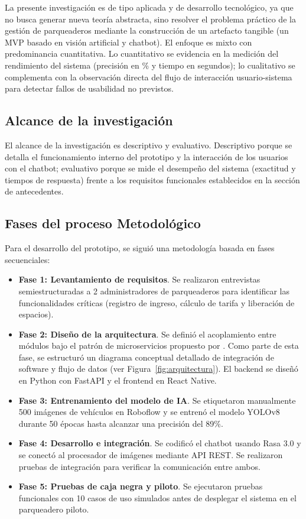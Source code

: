 La presente investigación es de tipo aplicada y de desarrollo tecnológico, ya que no busca generar nueva teoría abstracta, sino resolver el problema práctico de la gestión de parqueaderos mediante la construcción de un artefacto tangible (un MVP basado en visión artificial y chatbot). El enfoque es mixto con predominancia cuantitativa. Lo cuantitativo se evidencia en la medición del rendimiento del sistema (precisión en \% y tiempo en segundos); lo cualitativo se complementa con la observación directa del flujo de interacción usuario-sistema para detectar fallos de usabilidad no previstos.

\subsection{Alcance de la investigación}

El alcance de la investigación es descriptivo y evaluativo. Descriptivo porque se detalla el funcionamiento interno del prototipo y la interacción de los usuarios con el chatbot; evaluativo porque se mide el desempeño del sistema (exactitud y tiempos de respuesta) frente a los requisitos funcionales establecidos en la sección de antecedentes.

\subsection{Fases del proceso Metodológico}

Para el desarrollo del prototipo, se siguió una metodología basada en fases secuenciales:

\begin{itemize}
    \item \textbf{Fase 1: Levantamiento de requisitos}. Se realizaron entrevistas semiestructuradas a 2 administradores de parqueaderos para identificar las funcionalidades críticas (registro de ingreso, cálculo de tarifa y liberación de espacios).
    \item \textbf{Fase 2: Diseño de la arquitectura}. Se definió el acoplamiento entre módulos bajo el patrón de microservicios propuesto por \textcite{Garcia2023}. Como parte de esta fase, se estructuró un diagrama conceptual detallado de integración de software y flujo de datos (ver Figura~\ref{fig:arquitectura}). El backend se diseñó en Python con FastAPI y el frontend en React Native.
    \item \textbf{Fase 3: Entrenamiento del modelo de IA}. Se etiquetaron manualmente 500 imágenes de vehículos en Roboflow y se entrenó el modelo YOLOv8 durante 50 épocas hasta alcanzar una precisión del 89\%.
    \item \textbf{Fase 4: Desarrollo e integración}. Se codificó el chatbot usando Rasa 3.0 y se conectó al procesador de imágenes mediante API REST. Se realizaron pruebas de integración para verificar la comunicación entre ambos.
    \item \textbf{Fase 5: Pruebas de caja negra y piloto}. Se ejecutaron pruebas funcionales con 10 casos de uso simulados antes de desplegar el sistema en el parqueadero piloto.
\end{itemize}

